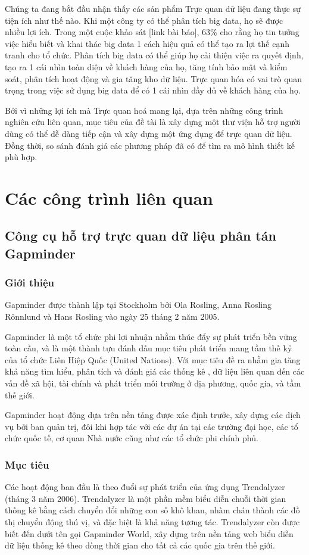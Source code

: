 \documentclass[12pt,a4paper,oneside]{article}
\begin{document}
Chúng ta đang bắt đầu nhận thấy các sản phẩm Trực quan dữ liệu đang thực sự tiện ích như thế nào. Khi một công ty có thể phân tích big data, họ sẽ được nhiều lợi ích. Trong một cuộc khảo sát [link bài báo], 63\% cho rằng họ tin tưởng việc hiểu biết và khai thác big data 1 cách hiệu quả có thể tạo ra lợi thế cạnh tranh cho tổ chức. Phân tích big data có thể giúp họ cải thiện việc ra quyết định, tạo ra 1 cái nhìn toàn diện về khách hàng của họ, tăng tính bảo mật và kiểm soát, phân tích hoạt động và gia tăng kho dữ liệu. Trực quan hóa có vai trò quan trọng trong việc sử dụng big data để có 1 cái nhìn đầy đủ về khách hàng của họ.

Bởi vì những lợi ích mà Trực quan hoá mang lại, dựa trên những công trình nghiên cứu liên quan, mục tiêu của đề tài là xây dựng một thư viện hỗ trợ người dùng có thể dễ dàng tiếp cận và xây dựng một ứng dụng để trực quan dữ liệu. Đồng thời, so sánh  đánh giá các phương pháp đã có để tìm ra mô hình thiết kế phù hợp.  

\section{Các công trình liên quan}
\subsection{Công cụ hỗ trợ trực quan dữ liệu phân tán Gapminder}
\subsubsection{Giới thiệu}
Gapminder\cite{gapminder} được thành lập tại Stockholm bởi Ola Rosling, Anna Rosling Rönnlund và Hans Rosling vào ngày 25 tháng 2 năm 2005. 

Gapminder là một tổ chức phi lợi nhuận nhằm thúc đẩy sự phát triển bền vững toàn cầu, và là một thành tựu đánh dấu mục tiêu phát triển mang tầm thế kỷ của tổ chức Liên Hiệp Quốc (United Nations). Với mục tiêu đề ra nhằm gia tăng khả năng tìm hiểu, phân tích và đánh giá các thống kê , dữ liệu liên quan đến các vấn đề xã hội, tài chính và phát triển môi trường ở địa phương, quốc gia, và tầm thế giới.

Gapminder hoạt động dựa trên nền tảng được xác định trước, xây dựng các dịch vụ bởi ban quản trị, đôi khi hợp tác với các dự án  tại các trường đại học, các tổ chức quốc tế, cơ quan Nhà nước cũng như các tổ chức phi chính phủ.

\subsubsection{Mục tiêu}
Các hoạt động ban đầu là theo đuổi sự phát triển của ứng dụng Trendalyzer (tháng 3 năm 2006). Trendalyzer là một phần mềm biểu diễn chuỗi thời gian thống kê bằng cách chuyển đổi những con số khô khan, nhàm chán thành các đồ thị chuyển động thú vị, và đặc biệt là khả năng tương tác. Trendalyzer còn được biết đến dưới tên gọi Gapminder World, xây dựng trên nền tảng web biểu diễn dữ liệu thống kê theo dòng thời gian cho tất cả các quốc gia trên thế giới.
\end{document}

